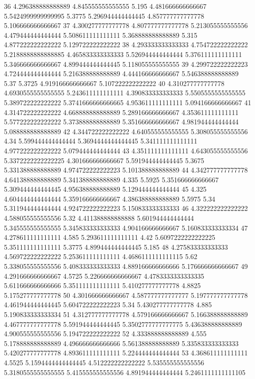 36 4.296388888888889 4.845555555555555 5.195 4.481666666666667 5.5424999999999995 5.3775 5.296944444444445 4.857777777777778 5.106666666666667
37 4.300277777777778 4.807777777777778 5.213055555555556 4.479444444444444 5.508611111111111 5.368888888888889 5.315 4.877222222222222 5.129722222222222
38 4.293333333333333 4.754722222222222 5.2188888888888885 4.465833333333333 5.526944444444444 5.376111111111111 5.346666666666667 4.899444444444445 5.118055555555555
39 4.299722222222223 4.724444444444444 5.216388888888889 4.444166666666667 5.546388888888889 5.37 5.3725 4.919166666666667 5.107222222222222
40 4.310277777777778 4.6930555555555555 5.243611111111111 4.390833333333333 5.5505555555555555 5.389722222222222 5.3741666666666665 4.953611111111111 5.094166666666667
41 4.314722222222222 4.668888888888889 5.289166666666667 4.353611111111111 5.577222222222222 5.373888888888889 5.351666666666667 4.981944444444444 5.088888888888889
42 4.344722222222222 4.640555555555555 5.308055555555556 4.34 5.599444444444444 5.3694444444444445 5.341111111111111 4.977222222222222 5.079444444444444
43 4.351111111111111 4.643055555555556 5.3372222222222225 4.301666666666667 5.591944444444445 5.3675 5.331388888888889 4.974722222222223 5.101388888888889
44 4.342777777777778 4.641388888888889 5.341388888888889 4.335 5.5925 5.351666666666667 5.309444444444445 4.956388888888889 5.129444444444444
45 4.325 4.604444444444444 5.359166666666667 4.386388888888889 5.5975 5.34 5.311944444444444 4.924722222222223 5.150833333333333
46 4.322222222222222 4.588055555555556 5.32 4.411388888888888 5.601944444444444 5.345555555555555 5.345833333333333 4.904166666666667 5.160833333333334
47 4.278611111111111 4.585 5.293611111111111 4.42 5.6097222222222225 5.351111111111111 5.3775 4.899444444444445 5.185
48 4.275833333333333 4.569722222222222 5.253611111111111 4.4686111111111115 5.62 5.338055555555556 5.408333333333333 4.889166666666666 5.176666666666667
49 4.291666666666667 4.5725 5.226666666666667 4.4783333333333335 5.611666666666666 5.351111111111111 5.410277777777778 4.8825 5.175277777777778
50 4.301666666666667 4.587777777777777 5.197777777777778 4.461944444444445 5.604722222222223 5.34 5.430277777777778 4.885 5.190833333333334
51 4.312777777777778 4.579166666666667 5.166388888888889 4.467777777777778 5.591944444444445 5.3502777777777775 5.436388888888889 4.900555555555556 5.194722222222222
52 4.333888888888889 4.555 5.178888888888889 4.496666666666666 5.561388888888889 5.335833333333333 5.420277777777778 4.893611111111111 5.224444444444444
53 4.368611111111111 4.5525 5.1594444444444445 4.512222222222222 5.535555555555556 5.3180555555555555 5.415555555555556 4.891944444444444 5.2461111111111105

